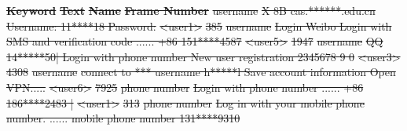 \documentclass[conference]{IEEEtran}
\providecommand{\DIFdeltex}[1]{{\protect\color{red}\sout{#1}}}                      %
\providecommand{\DIFdelbegin}{} %
\providecommand{\DIFdelFL}[1]{\DIFdel{#1}} %
\providecommand{\DIFdel}[1]{\texorpdfstring{\DIFdeltex{#1}}{}} %
\newcommand{\DIFscaledelfig}{0.5}
\newlength{\DIFdelgraphicswidth} %
\newlength{\DIFdelgraphicsheight} %
\newcommand{\DIFdelincludegraphics}[2][]{%
\sbox{\DIFdelgraphicsbox}{\DIFOincludegraphics[#1]{#2}}%
\settoboxwidth{\DIFdelgraphicswidth}{\DIFdelgraphicsbox} %
\settoboxtotalheight{\DIFdelgraphicsheight}{\DIFdelgraphicsbox} %
\scalebox{\DIFscaledelfig}{%
\parbox[b]{\DIFdelgraphicswidth}{\usebox{\DIFdelgraphicsbox}\\[-\baselineskip] \rule{\DIFdelgraphicswidth}{0em}}\llap{\resizebox{\DIFdelgraphicswidth}{\DIFdelgraphicsheight}{%
\setlength{\unitlength}{\DIFdelgraphicswidth}%
\begin{picture}(1,1)%
\thicklines\linethickness{2pt} %
{\color[rgb]{1,0,0}\put(0,0){\framebox(1,1){}}}%
{\color[rgb]{1,0,0}\put(0,0){\line( 1,1){1}}}%
{\color[rgb]{1,0,0}\put(0,1){\line(1,-1){1}}}%
\end{picture}%
}\hspace*{3pt}}} %
} %
\DeclareRobustCommand{\DIFdelbegin}{\DIFOdelbegin \let\includegraphics\DIFdelincludegraphics} %
\begin{document}
\DIFdelbegin %
\textbf{\DIFdelFL{Keyword}} %
\textbf{\DIFdelFL{Text}}                                                             %
\textbf{\DIFdelFL{Name}}                                   %
\textbf{\DIFdelFL{Frame Number}} %
\DIFdelFL{username                          }%
\DIFdelFL{X 8B cas.******.edu.cn Username: 11****18 Password:                                        }%
\DIFdelFL{\textless{}user1\textgreater{} }%
\DIFdelFL{385                                    }%
\DIFdelFL{username                          }%
\DIFdelFL{Login Weibo Login with SMS and verification code ...... +86 151****4587                    }%
\DIFdelFL{\textless{}user5\textgreater{} }%
\DIFdelFL{1947                                   }%
\DIFdelFL{username                          }%
\DIFdelFL{QQ 14*****50| Login with phone number New user registration 2345678 9 0                    }%
\DIFdelFL{\textless{}user3\textgreater{} }%
\DIFdelFL{4308                                   }%
\DIFdelFL{username                          }%
\DIFdelFL{connect to *** username h*****l Save account information Open VPN.....                     }%
\DIFdelFL{\textless{}user6\textgreater{} }%
\DIFdelFL{7925                                   }%
\DIFdelFL{phone number                      }%
\DIFdelFL{Login with phone number ...... +86 186****2483 |                                           }%
\DIFdelFL{\textless{}user1\textgreater{} }%
\DIFdelFL{313                                    }%
\DIFdelFL{phone number                      }%
\DIFdelFL{Log in with your mobile phone number. ...... mobile phone number 131****9310 }%
\end{document}
